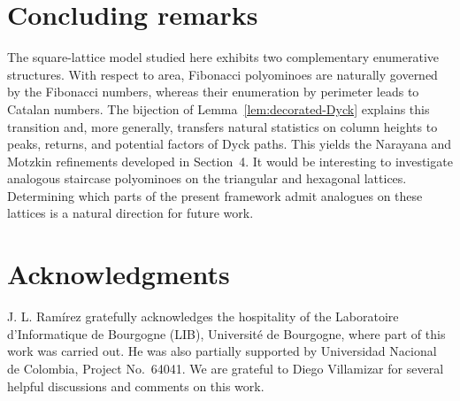 \documentclass[12pt]{amsart}
\theoremstyle{plain}
\theoremstyle{definition}
\begin{document}
\section{Concluding remarks}\label{sec:concluding}

The square-lattice model studied here exhibits two complementary
enumerative structures. With respect to area, Fibonacci polyominoes are
naturally governed by the Fibonacci numbers, whereas their enumeration
by perimeter leads to Catalan numbers.
The bijection of Lemma~\ref{lem:decorated-Dyck} explains this transition
and, more generally, transfers natural statistics on column heights to
peaks, returns, and potential factors of Dyck paths. This yields the
Narayana and Motzkin refinements developed in Section~4. It would be interesting to investigate analogous staircase polyominoes
on the triangular and hexagonal lattices. 
Determining which parts of the present framework admit analogues on
these lattices is a natural direction for future work.

\section*{Acknowledgments}
J. L. Ramírez gratefully acknowledges the hospitality of the Laboratoire d'Informatique de Bourgogne (LIB), Université de Bourgogne, where part of this work was carried out. He was also partially supported by Universidad Nacional de Colombia, Project No.~64041. We are grateful to Diego Villamizar for several helpful discussions and comments on this work.
\end{document}
